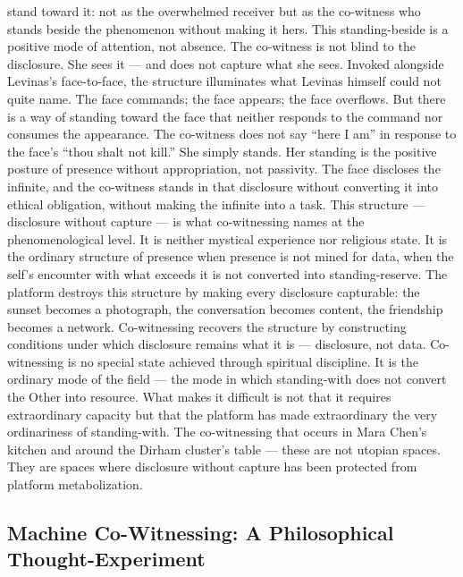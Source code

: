 stand toward it: not as the overwhelmed receiver but as the co-witness who stands beside the phenomenon without making it hers. This standing-beside is a positive mode of attention, not absence. The co-witness is not blind to the disclosure. She sees it — and does not capture what she sees. Invoked alongside Levinas’s face-to-face, the structure illuminates what Levinas himself could not quite name. The face commands; the face appears; the face overflows. But there is a way of standing toward the face that neither responds to the command nor consumes the appearance. The co-witness does not say “here I am” in response to the face’s “thou shalt not kill.” She simply stands. Her standing is the positive posture of presence without appropriation, not passivity. The face discloses the infinite, and the co-witness stands in that disclosure without converting it into ethical obligation, without making the infinite into a task. This structure — disclosure without capture — is what co-witnessing names at the phenomenological level. It is neither mystical experience nor religious state. It is the ordinary structure of presence when presence is not mined for data, when the self’s encounter with what exceeds it is not converted into standing-reserve. The platform destroys this structure by making every disclosure capturable: the sunset becomes a photograph, the conversation becomes content, the friendship becomes a network. Co-witnessing recovers the structure by constructing conditions under which disclosure remains what it is — disclosure, not data. Co-witnessing is no special state achieved through spiritual discipline. It is the ordinary mode of the field — the mode in which standing-with does not convert the Other into resource. What makes it difficult is not that it requires extraordinary capacity but that the platform has made extraordinary the very ordinariness of standing-with. The co-witnessing that occurs in Mara Chen’s kitchen and around the Dirham cluster’s table — these are not utopian spaces. They are spaces where disclosure without capture has been protected from platform metabolization.

\subsection{Machine Co-Witnessing: A Philosophical Thought-Experiment}

